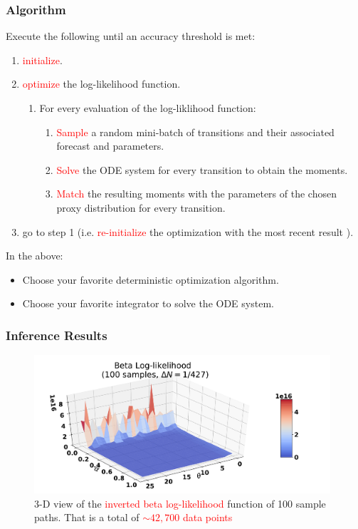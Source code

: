 \documentclass[aspectratio=169]{beamer}\usepackage[utf8]{inputenc}
\begin{document}
\begin{frame}\frametitle{Algorithm}

Execute the following until an accuracy threshold is met:
\begin{enumerate}
\item \textcolor{red}{initialize}.
\item \textcolor{red}{optimize} the log-likelihood function.
\begin{enumerate}
\item For every evaluation of the log-liklihood function:
\begin{enumerate}
  \item \textcolor{red}{Sample} a random mini-batch of transitions and their associated forecast and parameters.
  \item \textcolor{red}{Solve} the ODE system for every transition to obtain the moments.
  \item \textcolor{red}{Match} the resulting moments with the parameters of the chosen proxy distribution for every transition.
\end{enumerate}
\end{enumerate}
\item go to step 1 (i.e. \textcolor{red}{re-initialize} the optimization with the most recent result ).
\end{enumerate}

In the above:
\begin{itemize}
\item Choose your favorite deterministic optimization algorithm.
\item Choose your favorite integrator to solve the ODE system.
\end{itemize}
\end{frame}

\begin{frame}\frametitle{Inference Results}

\begin{figure}
  \includegraphics[width=110mm,scale=1]{plots/beta_likeli_3d.pdf}
  \caption{3-D view of the \textcolor{red}{inverted beta log-likelihood}  function of 100 sample paths. That is a total of  \textcolor{red}{ $\sim 42,700$ data points }}
\end{figure}
\end{frame}
\end{document}
